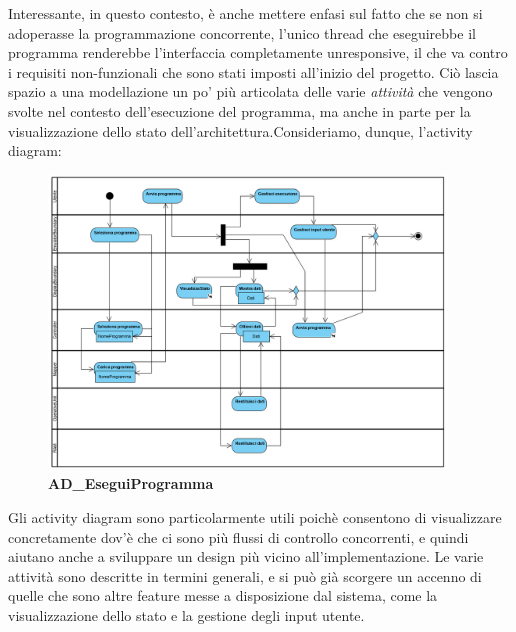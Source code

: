 \documentclass[11pt]{article}
\begin{document}
Interessante, in questo contesto, è anche mettere enfasi sul fatto che se non si adoperasse la programmazione concorrente, l'unico thread che eseguirebbe il programma renderebbe l'interfaccia completamente unresponsive, il che va contro i requisiti non-funzionali che sono stati imposti all'inizio del progetto. Ciò lascia spazio a una modellazione un po' più articolata delle varie \emph{attività} che vengono svolte nel contesto dell'esecuzione del programma, ma anche in parte per la visualizzazione dello stato dell'architettura.\clearpage Consideriamo, dunque, l'activity diagram:
\begin{figure}[h]
\hspace*{-1cm}
\centering
\includegraphics[width=400px, height=295px]{AD_EseguiProgramma.png}\\
\small\textbf{AD\_EseguiProgramma}
\end{figure}


Gli activity diagram sono particolarmente utili poichè consentono di visualizzare concretamente dov'è che ci sono più flussi di controllo concorrenti, e quindi aiutano anche a sviluppare un design più vicino all'implementazione. Le varie attività sono descritte in termini generali, e si può già scorgere un accenno di quelle che sono altre feature messe a disposizione dal sistema, come la visualizzazione dello stato e la gestione degli input utente. 
\end{document}
